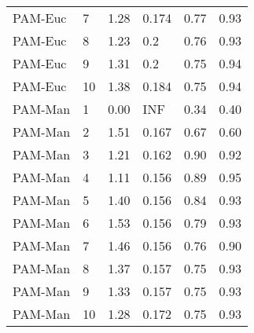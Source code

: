 \begin{table}[ht]
\begin{tabular}{llrlrr}
  PAM-Euc & 7 & 1.28 & 0.174 & 0.77 & 0.93 \\ 
  PAM-Euc & 8 & 1.23 & 0.2 & 0.76 & 0.93 \\ 
  PAM-Euc & 9 & 1.31 & 0.2 & 0.75 & 0.94 \\ 
  PAM-Euc & 10 & 1.38 & 0.184 & 0.75 & 0.94 \\ 
  PAM-Man & 1 & 0.00 & INF & 0.34 & 0.40 \\ 
  PAM-Man & 2 & 1.51 & 0.167 & 0.67 & 0.60 \\ 
  PAM-Man & 3 & 1.21 & 0.162 & 0.90 & 0.92 \\ 
  PAM-Man & 4 & 1.11 & 0.156 & 0.89 & 0.95 \\ 
  PAM-Man & 5 & 1.40 & 0.156 & 0.84 & 0.93 \\ 
  PAM-Man & 6 & 1.53 & 0.156 & 0.79 & 0.93 \\ 
  PAM-Man & 7 & 1.46 & 0.156 & 0.76 & 0.90 \\ 
  PAM-Man & 8 & 1.37 & 0.157 & 0.75 & 0.93 \\ 
  PAM-Man & 9 & 1.33 & 0.157 & 0.75 & 0.93 \\ 
  PAM-Man & 10 & 1.28 & 0.172 & 0.75 & 0.93 \\ 
   \hline
\end{tabular}
\end{table}
